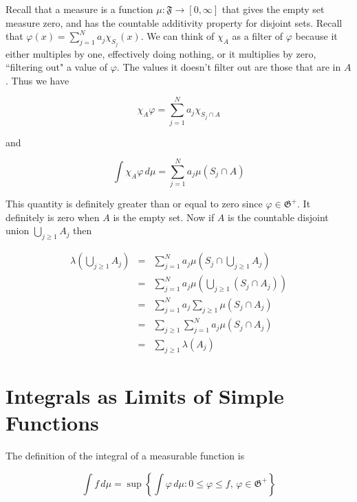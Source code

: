 \documentclass[oneside]{book}
\newenvironment{proof}[1][Proof]{\begin{trivlist}
\item[\hskip \labelsep {\bfseries #1}]}{\end{trivlist}}
\begin{document}
\begin{proof}
Recall that a measure is a function $\mu: \mathfrak{F} \to [0,\infty]$ that gives the empty set measure zero, and has the countable additivity property for disjoint sets. Recall that $\varphi(x)=\sum_{j=1}^N a_j \chi_{S_j}(x)$. We can think of $\chi_A$ as a filter of $\varphi$ because it either multiples by one, effectively doing nothing, or it multiplies by zero, ``filtering out" a value of $\varphi$. The values it doesn't filter out are those that are in $A$. Thus we have

\begin{equation}
\chi_A \varphi = \sum_{j=1}^N a_j \chi_{S_j \cap A}
\end{equation}
 
and

\begin{equation}
\int \chi_A \varphi\, d\mu = \sum_{j=1}^N a_j \mu(S_j \cap A)
\end{equation}
 
This quantity is definitely greater than or equal to zero since $\varphi \in \mathfrak{G}^+$. It definitely is zero when $A$ is the empty set. Now if $A$ is the countable disjoint union $\bigcup_{j \ge 1} A_j$ then

\begin{eqnarray}
\lambda \left( \bigcup_{j \ge 1} A_j \right) &=& \sum_{j=1}^N a_j \mu \left( S_j \cap \bigcup_{j \ge 1} A_j  \right) \nonumber \\
&=& \sum_{j=1}^N a_j \mu \left( \bigcup_{j \ge 1} (S_j \cap A_j)  \right) \nonumber \\
&=& \sum_{j=1}^N a_j \sum_{j \ge 1} \mu (S_j \cap A_j) \nonumber \\
&=&  \sum_{j \ge 1} \sum_{j=1}^N a_j \mu (S_j \cap A_j) \nonumber \\
&=&  \sum_{j \ge 1} \lambda(A_j)
\end{eqnarray}
 
\end{proof}

\section{Integrals as Limits of Simple Functions}
The definition of the integral of a measurable function is

\begin{equation}
\int f\, d\mu = \sup \left\{ \int \varphi\, d\mu: 0 \le \varphi \le f,\, \varphi \in \mathfrak{G}^+ \right\}
\end{equation}
\end{document}
